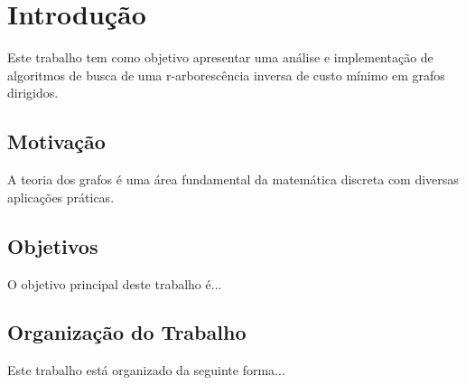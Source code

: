 \chapter{Introdução}
\label{cap:introducao}

Este trabalho tem como objetivo apresentar uma análise e implementação de algoritmos de busca de uma r-arborescência inversa de custo mínimo em grafos dirigidos.

\section{Motivação}

A teoria dos grafos é uma área fundamental da matemática discreta com diversas aplicações práticas.

\section{Objetivos}

O objetivo principal deste trabalho é...

\section{Organização do Trabalho}

Este trabalho está organizado da seguinte forma...
